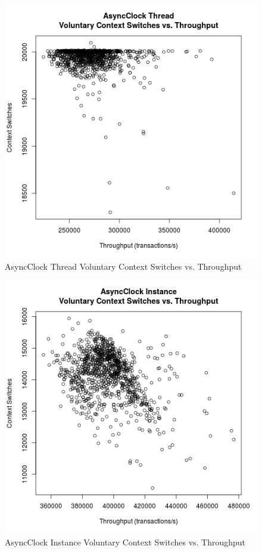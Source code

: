 \begin{figure}[H]
\center
\includegraphics[height=.4\textheight]{async_thread_throughput_context.png}
\caption{AsyncClock Thread Voluntary Context Switches vs. Throughput}
\label{async_thread_throughput_context}
\end{figure}

\begin{figure}[H]
\center
\includegraphics[height=.4\textheight]{async_instance_throughput_context.png}
\caption{AsyncClock Instance Voluntary Context Switches vs. Throughput}
\label{async_instance_throughput_context}
\end{figure}

